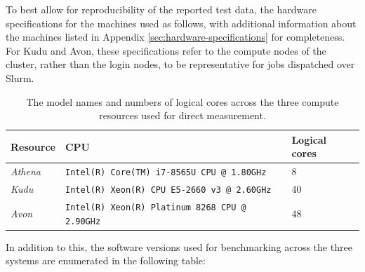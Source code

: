 To best allow for reproducibility of the reported test data, the hardware specifications for the machines used as follows, with additional information about the machines listed in Appendix \ref{sec:hardware-specifications} for completeness. For Kudu and Avon, these specifications refer to the compute nodes of the cluster, rather than the login nodes, to be representative for jobs dispatched over Slurm.

\begin{table}[H]
    \caption{The model names and numbers of logical cores across the three compute resources used for direct measurement.}
    \label{table:compute-resource-cpus}
    \begin{tabular}{|p{}||p{}|p{}|}
    \hline
    \textbf{Resource} & \textbf{CPU}                                            & \textbf{Logical cores} \\ \hline\hline
    \textit{Athena}   & \texttt{Intel(R) Core(TM) i7-8565U CPU @ 1.80GHz}     & 8                      \\ \hline
    \textit{Kudu}     & \texttt{Intel(R) Xeon(R) CPU E5-2660 v3 @ 2.60GHz}    & 40                     \\ \hline
    \textit{Avon}     & \texttt{Intel(R) Xeon(R) Platinum 8268 CPU @ 2.90GHz} & 48                     \\ \hline
    \end{tabular}
\end{table}

In addition to this, the software versions used for benchmarking across the three systems are enumerated in the following table:

